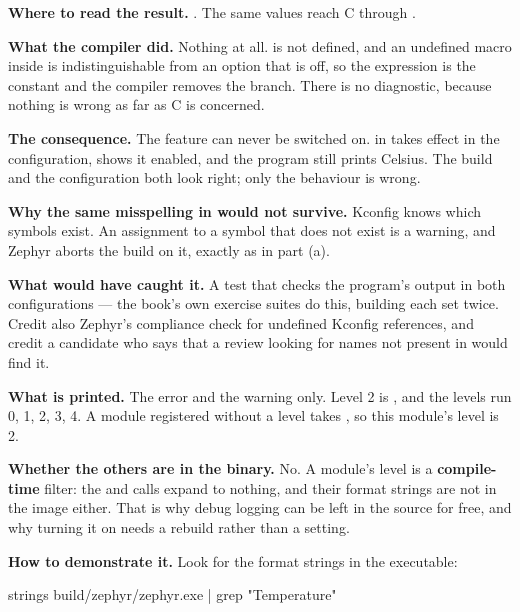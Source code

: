 \textbf{Where to read the result.} . The same values reach C through
. 

\textbf{What the compiler did.} Nothing at all.  is not defined, and an
undefined macro inside  is indistinguishable from an option that is off, so the
expression is the constant  and the compiler removes the branch. There is no diagnostic,
because nothing is wrong as far as C is concerned. 

\textbf{The consequence.} The feature can never be switched on.  in
 takes effect in the configuration,  shows it enabled, and the program
still prints Celsius. The build and the configuration both look right; only the behaviour is wrong.

\textbf{Why the same misspelling in  would not survive.} Kconfig knows which symbols
exist. An assignment to a symbol that does not exist is a warning, and Zephyr aborts the build on
it, exactly as in part (a). 

\textbf{What would have caught it.} A test that checks the program's output in both configurations
--- the book's own exercise suites do this, building each set twice. Credit also Zephyr's compliance
check for undefined Kconfig references, and credit a candidate who says that a review looking for
 names not present in  would find it. 

\textbf{What is printed.} The error and the warning only. Level 2 is , and the levels run
 0,  1,  2,  3,  4. A module registered without a
level takes , so this module's level is 2. 

\textbf{Whether the others are in the binary.} No. A module's level is a \textbf{compile-time}
filter: the  and  calls expand to nothing, and their format strings
are not in the image either. That is why debug logging can be left in the source for free, and why
turning it on needs a rebuild rather than a setting. 

\textbf{How to demonstrate it.} Look for the format strings in the executable:

\begin{shell}
strings build/zephyr/zephyr.exe | grep "Temperature"
\end{shell}

